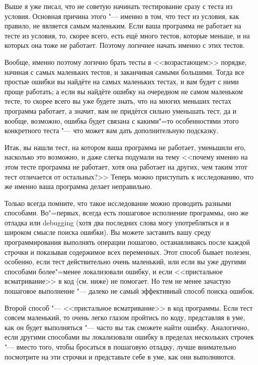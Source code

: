 Выше я уже писал, что не советую начинать тестирование сразу с теста из условия. 
Основная причина этого "--- именно в том, что тест из условия, как правило, не является самым маленьким. 
Если ваша программа не работает на тесте из условия, то, скорее всего, есть ещё много тестов, которые меньше, и на которых она тоже не работает.
Поэтому логичнее начать именно с этих тестов.

Вообще, именно поэтому логично брать тесты в <<возрастающем>> порядке, начиная с самых маленьких тестов, и заканчивая самыми большими.
Тогда все простые ошибки вы найдёте на самых маленьких тестах, и вам будет с ними проще работать;
а если вы найдёте ошибку на очередном не самом маленьком тесте, то скорее всего вы уже будете знать, что на многих меньших тестах программа
работает, а значит, вам не придётся сильно уменьшать тест, да и вообще, возможно, ошибка будет связана с какими"=то особенностями этого конкретного теста
"--- что может вам дать дополнительную подсказку.

Итак, вы нашли тест, на котором ваша программа не работает, уменьшили его, насколько это возможно, и даже слегка подумали на тему 
<<почему именно на этом тесте программа не работает, хотя она работает на других, чем таким этот тест отличается от остальных?>> 
Теперь можно приступать к исследованию, что же именно ваша программа делает неправильно.

Только всегда помните, что такое исследование можно проводить разными способами.
Во"=первых, всегда есть пошаговое исполнение программы, оно же отладка или debugging (хотя два последних слова могу употребляться
и в широком смысле поиска ошибки).
Вы можете заставить вашу среду программирования выполнять операции пошагово, останавливаясь после каждой строчки и показывая содержимое всех переменных.
Этот способ бывает полезен, особенно, если тест действительно очень маленький, или если вы уже другими способами более"=менее локализовали ошибку,
и если <<пристальное всматривание>> в код (см. ниже) не помогает. 
Но тем не менее зачастую пошаговое выполнение "--- далеко не самый эффективный способ поиска ошибок.

Второй способ "--- <<пристальное всматривание>> в код программы. 
Если тест совсем маленький, то очень легко глазом пройтись по коду, представляя в уме, как он будет выполняться "--- часто вы так сможете найти ошибку.
Аналогично, если другими способами вы локализовали ошибку в пределах нескольких строчек "--- вместо того, чтобы бросаться в пошаговую отладку,
лучше внимательно посмотрите на эти строчки и представьте себе в уме, как они выполняются.

